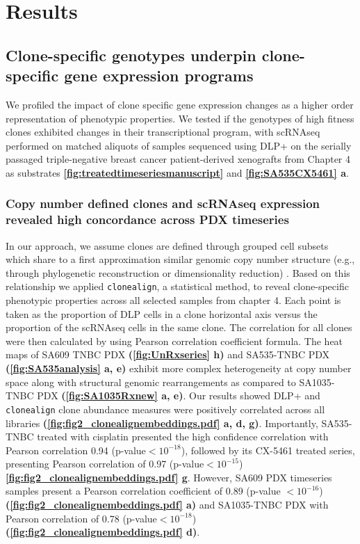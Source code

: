 
\section{Results}

\subsection{Clone-specific genotypes underpin clone-specific gene expression programs}
We profiled the impact of clone specific gene expression changes as a higher order representation of phenotypic properties. We tested if the genotypes of high fitness clones exhibited changes in their transcriptional program, with scRNAseq performed on matched aliquots of samples sequenced using DLP+ on the serially passaged triple-negative breast cancer patient-derived xenografts from Chapter 4 as substrates \textbf{\autoref{fig:treatedtimeseriesmanuscript}} and \textbf{\autoref{fig:SA535CX5461} a}.

\subsubsection{Copy number defined clones and scRNAseq expression revealed high concordance across PDX timeseries}
  In our approach, we assume clones are defined through grouped cell subsets which share to a first approximation similar genomic copy number structure (e.g., through phylogenetic reconstruction or dimensionality reduction) \cite{laks2019clonal}. Based on this relationship we applied
  \texttt{clonealign}, a statistical method, \cite{campbell2019clonealign} to reveal clone-specific phenotypic properties across all selected samples from chapter 4.
  Each point is taken as the proportion of DLP cells in a clone horizontal axis versus the proportion of the scRNAseq cells in the same clone. The  correlation for all clones were then calculated by using Pearson correlation coefficient formula. The heat maps of SA609 TNBC PDX \textbf{(\autoref{fig:UnRxseries} h)} and SA535-TNBC PDX \textbf{(\autoref{fig:SA535analysis} a, e)} exhibit more complex heterogeneity at copy number space along with structural genomic rearrangements as compared to SA1035-TNBC PDX \textbf{(\autoref{fig:SA1035Rxnew} a, e)}. Our results showed DLP+ and \texttt{clonealign} clone abundance measures were positively correlated across all libraries \textbf{(\autoref{fig:fig2_clonealignembeddings.pdf} a, d, g)}. Importantly, SA535-TNBC treated with cisplatin presented the high confidence correlation with Pearson correlation 0.94 (p-value$< 10^{-18}$), followed by its CX-5461 treated series, presenting Pearson correlation of 0.97 (p-value$< 10^{-15}$) \textbf{\autoref{fig:fig2_clonealignembeddings.pdf} g}. However, SA609 PDX timeseries samples present a Pearson correlation coefficient of 0.89 (p-value $< 10^{-16}$) \textbf{(\autoref{fig:fig2_clonealignembeddings.pdf} a)} and SA1035-TNBC PDX with Pearson correlation of 0.78 (p-value$< 10^{-18}$) \textbf{(\autoref{fig:fig2_clonealignembeddings.pdf} d)}.
  
